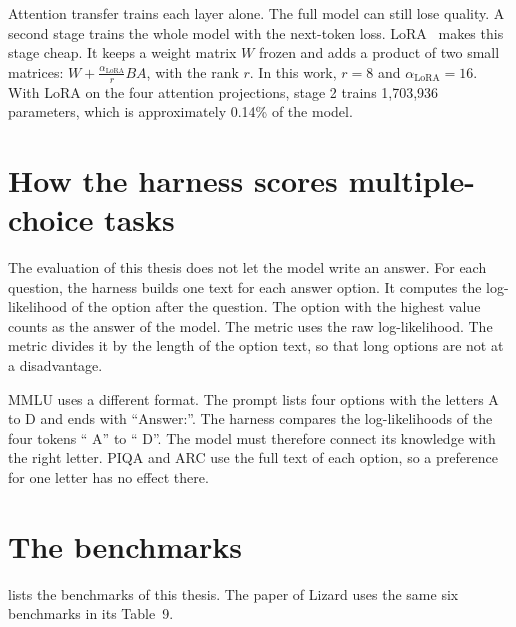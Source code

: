 Attention transfer trains each layer alone. The full model can still lose quality. A second stage trains the whole model with the next-token loss. LoRA~\cite{lora} makes this stage cheap. It keeps a weight matrix $W$ frozen and adds a product of two small matrices: $W + \frac{\alpha_{\text{LoRA}}}{r} BA$, with the rank $r$. In this work, $r = 8$ and $\alpha_{\text{LoRA}} = 16$. With LoRA on the four attention projections, stage 2 trains 1,703,936 parameters, which is approximately 0.14\% of the model.

\section{How the harness scores multiple-choice tasks}
\label{sec:scoring}

The evaluation of this thesis does not let the model write an answer. For each question, the harness builds one text for each answer option. It computes the log-likelihood of the option after the question. The option with the highest value counts as the answer of the model. The metric  uses the raw log-likelihood. The metric  divides it by the length of the option text, so that long options are not at a disadvantage.

MMLU uses a different format. The prompt lists four options with the letters A to D and ends with \enquote{Answer:}. The harness compares the log-likelihoods of the four tokens \enquote{ A} to \enquote{ D}. The model must therefore connect its knowledge with the right letter. PIQA and ARC use the full text of each option, so a preference for one letter has no effect there.

\section{The benchmarks}
\label{sec:benchmarks}

 lists the benchmarks of this thesis. The paper of Lizard uses the same six benchmarks in its Table~9.


